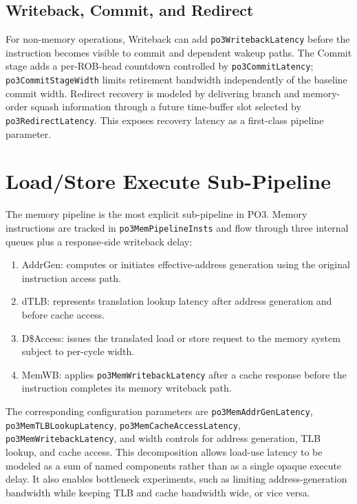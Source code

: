 \documentclass[10pt,twocolumn]{article}
\newcommand{\po}{\textsc{PO3}}
\newcommand{\stage}[1]{\textsf{#1}}
\begin{document}
\subsection{Writeback, Commit, and Redirect}
For non-memory operations, \stage{Writeback} can add \texttt{po3WritebackLatency} before the instruction becomes visible to commit and dependent wakeup paths.  The \stage{Commit} stage adds a per-ROB-head countdown controlled by \texttt{po3CommitLatency}; \texttt{po3CommitStageWidth} limits retirement bandwidth independently of the baseline commit width.  Redirect recovery is modeled by delivering branch and memory-order squash information through a future time-buffer slot selected by \texttt{po3RedirectLatency}.  This exposes recovery latency as a first-class pipeline parameter.

\section{Load/Store Execute Sub-Pipeline}
The memory pipeline is the most explicit sub-pipeline in \po{}.  Memory instructions are tracked in \texttt{po3MemPipelineInsts} and flow through three internal queues plus a response-side writeback delay:
\begin{enumerate}
  \item \stage{AddrGen}: computes or initiates effective-address generation using the original instruction access path.
  \item \stage{dTLB}: represents translation lookup latency after address generation and before cache access.
  \item \stage{D\$Access}: issues the translated load or store request to the memory system subject to per-cycle width.
  \item \stage{MemWB}: applies \texttt{po3MemWritebackLatency} after a cache response before the instruction completes its memory writeback path.
\end{enumerate}

The corresponding configuration parameters are \texttt{po3MemAddrGenLatency}, \texttt{po3MemTLBLookupLatency}, \texttt{po3MemCacheAccessLatency}, \texttt{po3MemWritebackLatency}, and width controls for address generation, TLB lookup, and cache access.  This decomposition allows load-use latency to be modeled as a sum of named components rather than as a single opaque execute delay.  It also enables bottleneck experiments, such as limiting address-generation bandwidth while keeping TLB and cache bandwidth wide, or vice versa.
\end{document}
